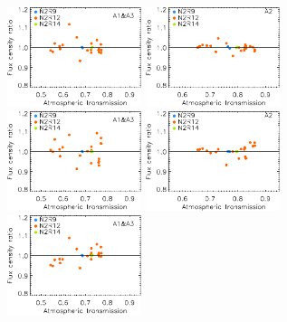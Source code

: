 \begin{figure}[ht!]
\begin{center}
  \includegraphics[clip=true, trim={0, -0.3cm, -0.3cm, 0}, width=0.35\textwidth]{Figures/Calibration/plot_flux_density_ratio_obstau_uranus_corrected_skydip_narrow_1mm.pdf}
  \includegraphics[clip=true, trim={0, -0.3cm, -0.3cm, 0}, width=0.35\textwidth]{Figures/Calibration/plot_flux_density_ratio_obstau_uranus_corrected_skydip_narrow_a2.pdf}
  \includegraphics[clip=true, trim={0, -0.3cm, -0.3cm, 0}, width=0.35\textwidth]{Figures/Calibration/plot_flux_density_ratio_obstau_uranus_tau225_narrow_1mm.pdf}
  \includegraphics[clip=true, trim={0, -0.3cm, -0.3cm, 0}, width=0.35\textwidth]{Figures/Calibration/plot_flux_density_ratio_obstau_uranus_tau225_narrow_a2.pdf}
  \includegraphics[clip=true, trim={0, -0.3cm, -0.3cm, 0}, width=0.35\textwidth]{Figures/Calibration/plot_flux_density_ratio_obstau_uranus_skydip_narrow_1mm.pdf}

\end{center}
\end{figure}
